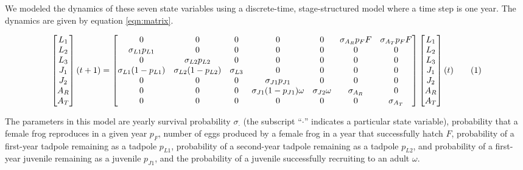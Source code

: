 \documentclass[9pt,twocolumn,twoside,lineno]{pnas-new}
\begin{document}
{We modeled the dynamics of these seven state variables using a
discrete-time, stage-structured model where a time step is one year. The
dynamics are given by equation \ref{eqn:matrix}.

\begin{figure}\[
\begin{bmatrix}
L_1 \\
L_2 \\
L_3 \\
J_1 \\
J_2 \\
A_R \\ 
A_T
\end{bmatrix}(t + 1) = 
\begin{bmatrix}
  0 & 0 & 0 & 0 & 0 & \sigma_{A_R} p_F F & \sigma_{A_T} p_F F \\
  \sigma_{L1} p_{L1} & 0 & 0 & 0 & 0 & 0 & 0 \\
  0 & \sigma_{L2} p_{L2} & 0 & 0 & 0 & 0 & 0\\
  \sigma_{L1} (1 - p_{L1}) & \sigma_{L2} (1 - p_{L2}) & \sigma_{L3} & 0 & 0 & 0 & 0 \\
  0 & 0 & 0 & \sigma_{J1} p_{J1} & 0 & 0 & 0 \\
  0 & 0 & 0 & \sigma_{J1} (1 - p_{J1}) \omega & \sigma_{J2} \omega & \sigma_{A_R} & 0 \\
  0 & 0 & 0 & 0 & 0 & 0 & \sigma_{A_T} 
\end{bmatrix} \begin{bmatrix}
L_1 \\
L_2 \\
L_3 \\
J_1 \\
J_2 \\
A_R \\
A_T \\
\end{bmatrix}(t)\numberthis \label{eqn:matrix} 
\]\end{figure}

The parameters in this model are yearly survival probability
\(\sigma_{\cdot}\) (the subscript ``\(\cdot\)'' indicates a particular
state variable), probability that a female frog reproduces in a given
year \(p_F\), number of eggs produced by a female frog in a year that
successfully hatch \(F\), probability of a first-year tadpole remaining
as a tadpole \(p_{L1}\), probability of a second-year tadpole remaining
as a tadpole \(p_{L2}\), and probability of a first-year juvenile
remaining as a juvenile \(p_{J1}\), and the probability of a juvenile
successfully recruiting to an adult \(\omega\).

}
\end{document}
